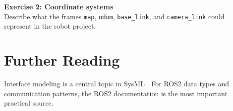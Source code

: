 \begin{uebungbox}
\textbf{Exercise 2: Coordinate systems}\\
Describe what the frames \texttt{map}, \texttt{odom}, \texttt{base\_link}, and \texttt{camera\_link} could represent in the robot project.
\end{uebungbox}

\section{Further Reading}
Interface modeling is a central topic in SysML \cite{friedenthal2014}. For ROS2 data types and communication patterns, the ROS2 documentation \cite{ros2docs} is the most important practical source.
